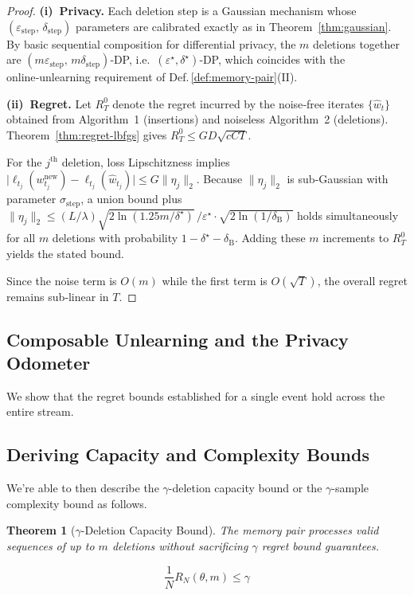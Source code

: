 \documentclass[a4paper,12pt]{article}
\newtheorem{theorem}{Theorem}
\begin{document}
\begin{proof}
\textbf{(i) Privacy.}
Each deletion step is a Gaussian mechanism whose $(\varepsilon_{\text{step}},\,
\delta_{\text{step}})$ parameters are calibrated exactly as in
Theorem~\ref{thm:gaussian}.  
By basic sequential composition for differential privacy,
the $m$ deletions together are
$(m\varepsilon_{\text{step}},\,m\delta_{\text{step}})$‑DP, i.e.\
$(\varepsilon^\star,\delta^\star)$‑DP, which coincides with the
online‑unlearning requirement of Def.\,\ref{def:memory-pair}(II).

\medskip
\noindent
\textbf{(ii) Regret.}
Let $R_{T}^{0}$ denote the regret incurred by the noise‑free iterates
$\{\hat w_{t}\}$ obtained from Algorithm 1 (insertions) and noiseless
Algorithm 2 (deletions).
Theorem~\ref{thm:regret-lbfgs} gives
$R_{T}^{0} \le GD\sqrt{cCT}$.

For the $j^{\text{th}}$ deletion, loss Lipschitzness implies  
$\bigl|\ell_{t_j}(w_{t_j}^{\text{new}})-\ell_{t_j}(\hat w_{t_j})\bigr|
      \le G\lVert\eta_j\rVert_2$.
Because $\lVert\eta_j\rVert_2$ is sub‑Gaussian with parameter
$\sigma_{\text{step}}$, a union bound plus
$\|\eta_j\|_2 \le
  (L/\lambda)\sqrt{2\ln(1.25m/\delta^{\star})}\,/\varepsilon^{\star}
  \cdot\sqrt{2\ln(1/\delta_{\mathrm{B}})}$
holds simultaneously for all $m$ deletions
with probability $1-\delta^\star-\delta_{\mathrm{B}}$.
Adding these $m$ increments to $R_{T}^{0}$ yields the stated bound.

Since the noise term is $O(m)$ while the first term is
$O(\sqrt{T})$, the overall regret remains sub‑linear in $T$.
\end{proof}
\subsection{Composable Unlearning and the Privacy Odometer}

We show that the regret bounds established for a single event hold across the entire stream.

\subsection{Deriving Capacity and Complexity Bounds}

We're able to then describe the $\gamma$-deletion capacity bound or the $\gamma$-sample complexity bound as follows.

\begin{theorem} [$\gamma$-Deletion Capacity Bound]

The memory pair processes valid sequences of up to $m$ deletions without sacrificing $\gamma$ regret bound guarantees.

$$
\frac{1}{N}R_{N}(\theta,m) \leq \gamma
$$

\end{theorem}
\end{document}
